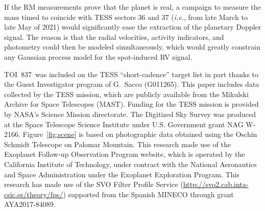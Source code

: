 \documentclass[12pt,twocolumn,tighten]{aastex63}
\newcommand{\tn}{TOI~837} %
\begin{document}
If the RM measurements prove that the planet
is real, a campaign to measure the mass timed to coincide with
TESS sectors 36 and 37 ({\it i.e.}, from late March to late May of
2021) would significantly ease the extraction of the planetary Doppler
signal.  The reason is that the radial velocities, activity
indicators, and photometry could then be modeled simultaneously, which
would greatly constrain any Gaussian process model for the
spot-induced RV signal. 










\acknowledgements
\tn\ was included on the TESS ``short-cadence'' target list in part
thanks to the Guest Investigator program of G.\ Sacco (G011265).
%
This paper includes data collected by the TESS mission, which are
publicly available from the Mikulski Archive for Space Telescopes
(MAST).
%
Funding for the TESS mission is provided by NASA's Science Mission
directorate.
%
The Digitized Sky Survey was produced at the Space Telescope Science
Institute under U.S. Government grant NAG W-2166.
Figure~\ref{fig:scene} is based on photographic data obtained using
the Oschin Schmidt Telescope on Palomar Mountain.
%
This research made use of the Exoplanet Follow-up Observation
Program website, which is operated by the California Institute of
Technology, under contract with the National Aeronautics and Space
Administration under the Exoplanet Exploration Program.
%
This research has made use of the SVO Filter Profile Service
(\url{http://svo2.cab.inta-csic.es/theory/fps/}) supported from the Spanish
MINECO through grant AYA2017-84089.
%
%
%
\end{document}

